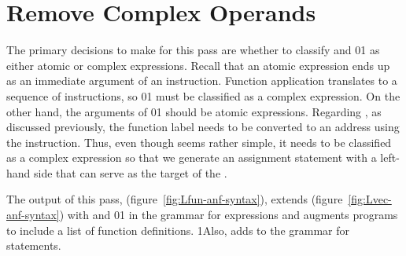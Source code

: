 \documentclass[7x10]{TimesAPriori_MIT}%
\def\racketEd{0}
\def\pythonEd{1}
\def\edition{1}
\newcommand{\racket}[1]{{\if\edition\racketEd{#1}\fi}}
\newcommand{\pythonColor}[0]{}
\newcommand{\python}[1]{{\if\edition\pythonEd\pythonColor #1\fi}}
\numberwithin{theorem}{chapter}
\numberwithin{definition}{chapter}
\numberwithin{equation}{chapter}
\begin{document}
\section{Remove Complex Operands}
\label{sec:rco-r4}

The primary decisions to make for this pass are whether to classify
 and \racket{}\python{} as either
atomic or complex expressions. Recall that an atomic expression 
ends up as an immediate argument of an {\ArchName} instruction. Function
application translates to a sequence of instructions, so
\racket{}\python{} must be classified as
a complex expression.  On the other hand, the arguments of
\racket{}\python{} should be atomic
expressions.
%
Regarding , as discussed previously, the function label
needs to be converted to an address using the {\ILEA}
instruction. Thus, even though  seems rather simple, it
needs to be classified as a complex expression so that we generate an
assignment statement with a left-hand side that can serve as the
target of the \ILEA.

The output of this pass, \LangFunANF{} (figure~\ref{fig:Lfun-anf-syntax}),
extends \LangAllocANF{} (figure~\ref{fig:Lvec-anf-syntax}) with 
and \racket{}\python{} in the grammar for expressions
and augments programs to include a list of function definitions.
%
\python{Also, \LangFunANF{} adds  to the grammar for statements.}


\newcommand{\LfunMonadASTRacket}{
  \begin{array}{lcl}
  \Type &::=& (\Type \ldots \; \key{->}\; \Type) \\
  \Exp &::=& \FUNREF{\itm{label}}{\Int} \MID \APPLY{\Atm}{\Atm\ldots}\\
  \Def &::=& \FUNDEF{\Var}{\LP[\Var \code{:} \Type]\ldots\RP}{\Type}{\code{'()}}{\Exp}
  \end{array}
}

\newcommand{\LfunMonadASTPython}{
  \begin{array}{lcl}
    \Type &::=& \key{IntType()} \MID \key{BoolType()} \MID \key{VoidType()}
        \MID \key{TupleType}\LS\Type^+\RS\\
        &\MID& \key{FunctionType}\LP \Type^{*} \key{, } \Type \RP \\
    \Exp &::=& \FUNREF{\itm{label}}{\Int} \MID \CALL{\Atm}{\Atm^{*}}\\
    \Stmt &::=& \RETURN{\Exp} \\
   \Params &::=&  \LP\Var\key{,}\Type\RP^* \\
   \Def &::=& \FUNDEF{\Var}{\Params}{\Type}{}{\Stmt^{+}} 
  \end{array}
}
\end{document}
